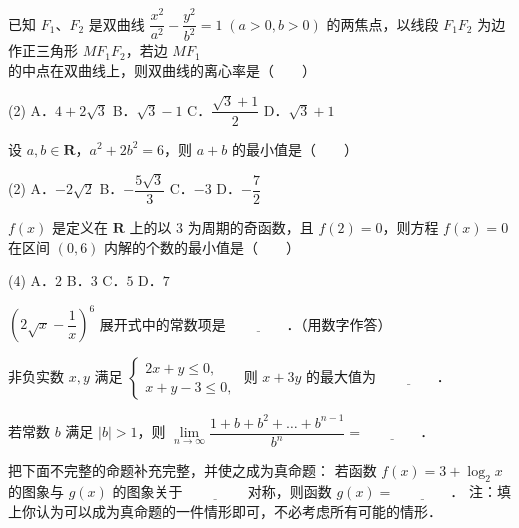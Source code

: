 \begin{question}
已知 $F_1$、$F_2$ 是双曲线 $\dfrac{x^2}{a^2} - \dfrac{y^2}{b^2} = 1 \; (a > 0, b > 0)$ 的两焦点，以线段 $F_1F_2$ 为边作正三角形 $MF_1F_2$，若边 $MF_1$ 的中点在双曲线上，则双曲线的离心率是\mbox{（　　）}

\begin{gkopts}(2)
\task A．$4 + 2\sqrt{3}$
\task B．$\sqrt{3} - 1$
\task C．$\dfrac{\sqrt{3} + 1}{2}$
\task D．$\sqrt{3} + 1$
\end{gkopts}

\end{question}
\begin{question}
设 $a, b \in \mathbf{R}$，$a^2 + 2b^2 = 6$，则 $a + b$ 的最小值是\mbox{（　　）}

\begin{gkopts}(2)
\task A．$-2\sqrt{2}$
\task B．$-\dfrac{5\sqrt{3}}{3}$
\task C．$-3$
\task D．$-\dfrac{7}{2}$
\end{gkopts}

\end{question}
\begin{question}
$f(x)$ 是定义在 $\mathbf{R}$ 上的以 3 为周期的奇函数，且 $f(2) = 0$，则方程 $f(x) = 0$ 在区间 $(0, 6)$ 内解的个数的最小值是\mbox{（　　）}

\begin{gkopts}(4)
\task A．$2$
\task B．$3$
\task C．$5$
\task D．$7$
\end{gkopts}

\end{question}

\begin{question}
$\left(2\sqrt{x} - \dfrac{1}{x}\right)^6$ 展开式中的常数项是 $\underline{\qquad\qquad}$．（用数字作答）

\end{question}
\begin{question}
非负实数 $x, y$ 满足 $\begin{cases} 2x + y \leqslant 0, \\ x + y - 3 \leqslant 0, \end{cases}$ 则 $x + 3y$ 的最大值为 $\underline{\qquad\qquad}$．

\end{question}
\begin{question}
若常数 $b$ 满足 $|b| > 1$，则 $\lim\limits_{n\to\infty} \dfrac{1 + b + b^2 + \dots + b^{n-1}}{b^n} = \underline{\qquad\qquad}$．

\end{question}
\begin{question}
把下面不完整的命题补充完整，并使之成为真命题：
若函数 $f(x) = 3 + \log_2 x$ 的图象与 $g(x)$ 的图象关于 $\underline{\qquad\qquad}$ 对称，则函数 $g(x) = \underline{\qquad\qquad}$．
注：填上你认为可以成为真命题的一件情形即可，不必考虑所有可能的情形．

\end{question}

